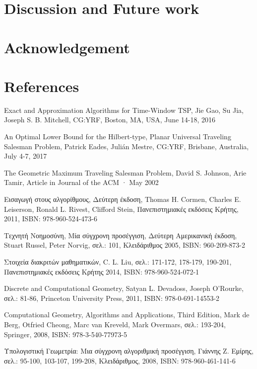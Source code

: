 \documentclass[oneside,12pt]{book}
\theoremstyle{definition}
\begin{document}
\chapter{Discussion and Future work}

\chapter{Acknowledgement}

\chapter{References}
\begin{thebibliography}{depth}
	Exact and Approximation Algorithms for Time-Window TSP, 
	Jie Gao, Su Jia, Joseph S. B. Mitchell,
	CG:YRF, Boston, MA, USA, June 14-18, 2016
	
	An Optimal Lower Bound for the Hilbert-type, Planar Universal Traveling Salesman Problem, 
	Patrick Eades, Julián Mestre,
	CG:YRF, Brisbane, Australia, July 4-7, 2017
	
	The Geometric Maximum Traveling Salesman Problem, 
	David S. Johnson, Arie Tamir,
	Article in Journal of the ACM · May 2002
	
	Εισαγωγή στους αλγορίθμους, Δεύτερη έκδοση, 
	Thomas H. Cormen, Charles E. Leiserson, Ronald L. Rivest, Clifford Stein,
	Πανεπιστημιακές εκδόσεις Κρήτης, 2011,
	ISBN: 978-960-524-473-6
	
	Τεχνητή Νοημοσύνη, Μία σύγχρονη προσέγγιση, Δεύτερη Αμερικανική έκδοση, 
	Stuart Russel, Peter Norvig,
	σελ.: 101,
	Κλειδάριθμος 2005,
	ISBN: 960-209-873-2
	
	Στοιχεία διακριτών μαθηματικών, 
	C. L. Liu,
	σελ.: 171-172, 178-179, 190-201,
	Πανεπιστημιακές εκδόσεις Κρήτης 2014, 
	ISBN: 978-960-524-072-1	
	
	Discrete and Computational Geometry, 
	Satyan L. Devadoss, Joseph O'Rourke,
	σελ.: 81-86,
	Princeton University Press, 2011, 
	ISBN: 978-0-691-14553-2
	
	Computational Geometry,	Algorithms and Applications, Third Edition, 
	Mark de Berg, Otfried Cheong, Marc van Kreveld, Mark Overmars,
	σελ.: 193-204,
	Springer, 2008, 
	ISBN: 978-3-540-77973-5
	
	Υπολογιστική Γεωμετρία: Μια σύγχρονη αλγοριθμική προσέγγιση, 
	Γιάννης Ζ. Εμίρης,
	σελ.: 95-100, 103-107, 199-208,
	Κλειδάριθμος, 2008, 
	ISBN: 978-960-461-141-6 
	

\end{thebibliography}
\end{document}
